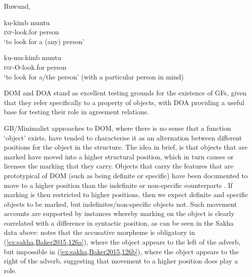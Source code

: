 \documentclass[output=paper
,modfonts
,nonflat]{langsci/langscibook}
\begin{document}
\begin{exe}
\ex Ruwund, \citet[][4]{woolford2001}  \label{ex:ruwund}
\begin{xlist}
\ex
{\gll ku-kimb muntu\\
\textsc{inf}-look.for person\\
\glt `to look for a (any) person'} \label{ex:ruwunda}

\ex
{\gll ku-mu-kimb muntu\\
\textsc{inf-O}-look.for person\\
\glt `to look for a/the person' (with a particular person in mind)}  \label{ex:ruwundb}
\end{xlist}
\end{exe}

\noindent DOM and DOA stand as excellent testing grounds for the existence of GFs, given that they refer specifically to a property of objects, with DOA providing a useful base for testing their role in agreement relations.

GB/Minimalist approaches to DOM, where there is no sense that a function `object' exists, have tended to characterise it as an alternation between different positions for the object in the structure.
The idea in brief, is that objects that are marked have moved into a higher structural position, which in turn causes or licenses the marking that they carry. Objects that carry the features that are prototypical of DOM (such as being definite or specific) have been documented to move to a higher position than the indefinite or non-specific counterparts \parencite{Diesing1992}. 
If marking is then restricted to higher positions, then we expect definite and specific objects to be marked, but indefinites/non-specific objects not.
Such movement accounts are supported by instances whereby marking on the object is clearly correlated with a difference in syntactic position, as can be seen in the Sakha data above: \citeauthor{Baker2015} notes that the accusative morpheme is obligatory in
(\ref{ex:sakha,Baker2015,126a}), where the object appears to the left of the adverb, but impossible in (\ref{ex:sakha,Baker2015,126b}), where the object appears to the right of the adverb, suggesting that movement to a higher position does play a role.
\end{document}
